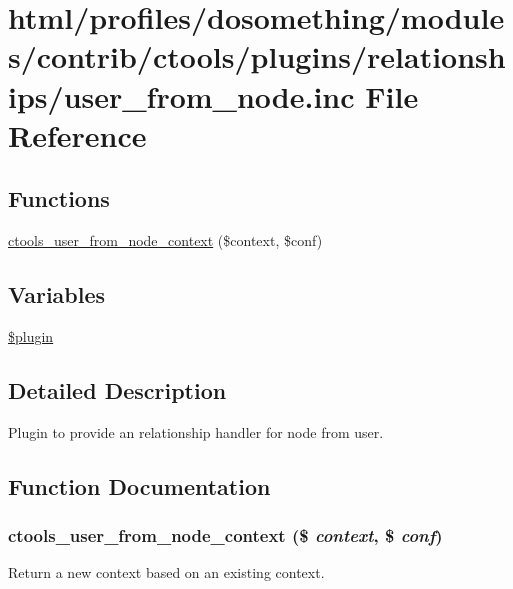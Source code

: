 \hypertarget{user__from__node_8inc}{
\section{html/profiles/dosomething/modules/contrib/ctools/plugins/relationships/user\_\-from\_\-node.inc File Reference}
\label{user__from__node_8inc}
}
\subsection*{Functions}
\begin{DoxyCompactItemize}
\item 
\hyperlink{user__from__node_8inc_a40cbcb0aef12ab13b672b8d49a30e768}{ctools\_\-user\_\-from\_\-node\_\-context} (\$context, \$conf)
\end{DoxyCompactItemize}
\subsection*{Variables}
\begin{DoxyCompactItemize}
\item 
\hyperlink{user__from__node_8inc_ada8a7130088351710bb02ed622d6bf65}{\$plugin}
\end{DoxyCompactItemize}


\subsection{Detailed Description}
Plugin to provide an relationship handler for node from user. 

\subsection{Function Documentation}
\hypertarget{user__from__node_8inc_a40cbcb0aef12ab13b672b8d49a30e768}{
\subsubsection[{ctools\_\-user\_\-from\_\-node\_\-context}]{\setlength{\rightskip}{0pt plus 5cm}ctools\_\-user\_\-from\_\-node\_\-context (\$ {\em context}, \/  \$ {\em conf})}}
\label{user__from__node_8inc_a40cbcb0aef12ab13b672b8d49a30e768}
Return a new context based on an existing context. 

